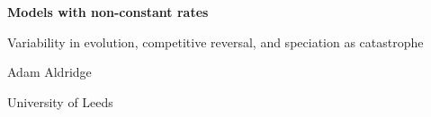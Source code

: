 \documentclass[11pt,a4paper]{report}
\begin{document}
\hypersetup{pageanchor=false}
\begin{titlepage}
\centering
\vspace*{4cm}
{\LARGE\bfseries Models with non-constant rates\par}
\vspace{6pt}
{\large Variability in evolution, competitive reversal, and speciation as
catastrophe\par}
\vspace{2.5cm}
{\large Adam Aldridge\par}
\vspace{4pt}
{University of Leeds\par}
\end{titlepage}
\hypersetup{pageanchor=true}

\tableofcontents
\clearpage



\FloatBarrier
\begingroup
\footnotesize
\makeatletter
\renewcommand\@openbib@code{\setlength{\itemsep}{0pt}\setlength{\parsep}{0pt}}
\makeatother


\endgroup
\end{document}
